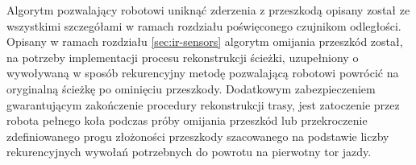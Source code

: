 Algorytm pozwalający robotowi uniknąć zderzenia z przeszkodą opisany został ze
wszystkimi szczegółami w ramach rozdziału poświęconego czujnikom odległości. Opisany w
ramach rozdziału \ref{sec:ir-sensors} algorytm omijania przeszkód został, na
potrzeby implementacji procesu rekonstrukcji ścieżki, uzupełniony o wywoływaną w
sposób rekurencyjny metodę pozwalającą robotowi powrócić na oryginalną ścieżkę
po ominięciu przeszkody. Dodatkowym zabezpieczeniem gwarantującym zakończenie
procedury rekonstrukcji trasy, jest zatoczenie przez robota pełnego koła podczas
próby omijania przeszkód lub przekroczenie zdefiniowanego progu złożoności
przeszkody szacowanego na podstawie liczby rekurencyjnych wywołań potrzebnych do
powrotu na pierwotny tor jazdy. 
